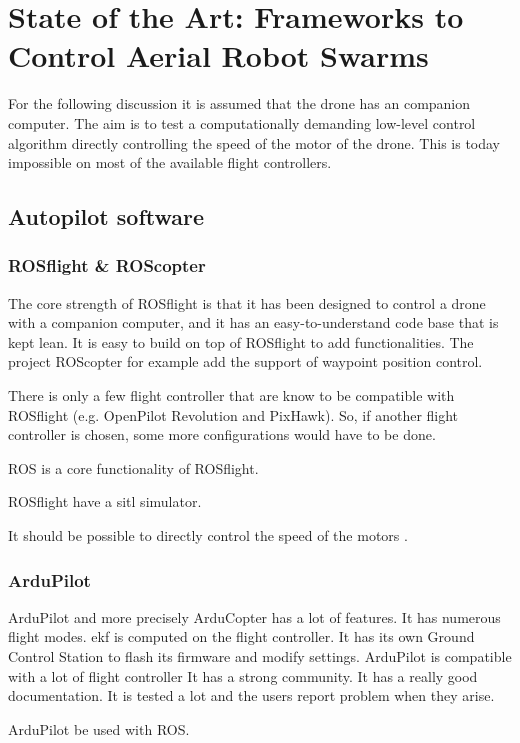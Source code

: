 \chapter{State of the Art: Frameworks to Control Aerial Robot Swarms}

For the following discussion it is assumed that the drone has an companion computer.
The aim is to test a computationally demanding low-level control algorithm directly controlling the speed of the motor of the drone. This is today impossible on most of the available flight controllers.

\section{Autopilot software}

\subsection{ROSflight \& ROScopter}
The core strength of ROSflight is that it has been designed to control a drone with a companion computer, and it has an easy-to-understand code base that is kept lean.
It is easy to build on top of ROSflight to add functionalities. The project ROScopter \cite{github_roscopter} for example add the support of waypoint position control.

There is only a few flight controller that are know to be compatible with ROSflight (e.g. OpenPilot Revolution and PixHawk).
So, if another flight controller is chosen, some more configurations would have to be done.

ROS is a core functionality of ROSflight.

ROSflight have a \gls{sitl} simulator.

It should be possible to directly control the speed of the motors \cite{github_rosflight_98}.

\subsection{ArduPilot}
ArduPilot and more precisely ArduCopter has a lot of features.
It has numerous flight modes.
\Gls{ekf} is computed on the flight controller.
It has its own Ground Control Station to flash its firmware and modify settings.
ArduPilot is compatible with a lot of flight controller
It has a strong community.
It has a really good documentation.
It is tested a lot and the users report problem when they arise.

ArduPilot be used  with ROS.

